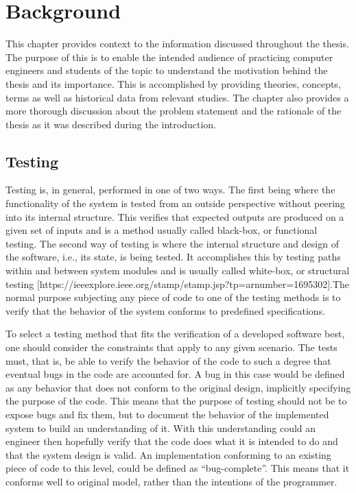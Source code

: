 \documentclass{article}
\begin{document}
\section{Background}\label{background}
This chapter provides context to the information discussed throughout the thesis. The purpose of this is to enable the intended audience of practicing computer engineers and students of the topic to understand the motivation behind the thesis and its importance. This is accomplished by providing theories, concepts, terms as well as historical data from relevant studies. The chapter also provides a more thorough discussion about the problem statement and the rationale of the thesis as it was described during the introduction. 

\subsection{Testing}\label{testing}
Testing is, in general, performed in one of two ways. The first being where the functionality of the system is tested from an outside perspective without peering into its internal structure. This verifies that expected outputs are produced on a given set of inputs and is a method usually called black-box, or functional testing. The second way of testing is where the internal structure and design of the software, i.e., its state, is being tested. It accomplishes this by testing paths within and between system modules and is usually called white-box, or structural testing [https://ieeexplore.ieee.org/stamp/stamp.jsp?tp=arnumber=1695302].The normal purpose subjecting any piece of code to one of the testing methods is to verify that the behavior of the system conforms to predefined specifications. 
 
To select a testing method that fits the verification of a developed software best, one should consider the constraints that apply to any given scenario. The tests must, that is, be able to verify the behavior of the code to such a degree that eventual bugs in the code are accounted for. A bug in this case would be defined as any behavior that does not conform to the original design, implicitly specifying the purpose of the code. This means that the purpose of testing should not be to expose bugs and fix them, but to document the behavior of the implemented system to build an understanding of it. With this understanding could an engineer then hopefully verify that the code does what it is intended to do and that the system design is valid. An implementation conforming to an existing piece of code to this level, could be defined as “bug-complete”. This means that it conforms well to original model, rather than the intentions of the programmer.
\end{document}
